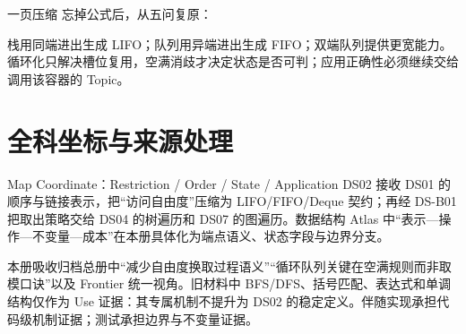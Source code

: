 \documentclass[UTF8,fontset=none,11pt,a4paper]{ctexart}
\begin{document}
\begin{corebox}{一页压缩}
忘掉公式后，从五问复原：

栈用同端进出生成 LIFO；队列用异端进出生成 FIFO；双端队列提供更宽能力。循环化只解决槽位复用，空满消歧才决定状态是否可判；应用正确性必须继续交给调用该容器的 Topic。
\end{corebox}

\section{全科坐标与来源处理}
\begin{corebox}{Map Coordinate：Restriction / Order / State / Application}
DS02 接收 DS01 的顺序与链接表示，把“访问自由度”压缩为 LIFO/FIFO/Deque 契约；再经 DS-B01 把取出策略交给 DS04 的树遍历和 DS07 的图遍历。数据结构 Atlas 中“表示—操作—不变量—成本”在本册具体化为端点语义、状态字段与边界分支。
\end{corebox}

本册吸收归档总册中“减少自由度换取过程语义”“循环队列关键在空满规则而非取模口诀”以及 Frontier 统一视角。旧材料中 BFS/DFS、括号匹配、表达式和单调结构仅作为 Use 证据：其专属机制不提升为 DS02 的稳定定义。伴随实现承担代码级机制证据；测试承担边界与不变量证据。
\end{document}
